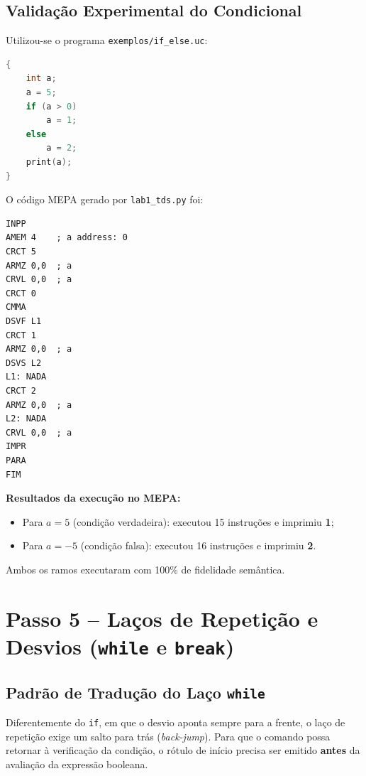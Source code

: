 \documentclass[12pt,a4paper]{article}
\begin{document}
\subsection{Validação Experimental do Condicional}

Utilizou-se o programa \texttt{exemplos/if\_else.uc}:
\begin{lstlisting}[language=C]
{
    int a;
    a = 5;
    if (a > 0)
        a = 1;
    else
        a = 2;
    print(a);
}
\end{lstlisting}

O código MEPA gerado por \texttt{lab1\_tds.py} foi:
\begin{lstlisting}
INPP
AMEM 4    ; a address: 0
CRCT 5
ARMZ 0,0  ; a
CRVL 0,0  ; a
CRCT 0
CMMA
DSVF L1
CRCT 1
ARMZ 0,0  ; a
DSVS L2
L1: NADA
CRCT 2
ARMZ 0,0  ; a
L2: NADA
CRVL 0,0  ; a
IMPR
PARA
FIM
\end{lstlisting}

\noindent\textbf{Resultados da execução no MEPA:}
\begin{itemize}
    \item Para $a = 5$ (condição verdadeira): executou 15 instruções e imprimiu \textbf{1};
    \item Para $a = -5$ (condição falsa): executou 16 instruções e imprimiu \textbf{2}.
\end{itemize}
Ambos os ramos executaram com 100\% de fidelidade semântica.

\section{Passo 5 -- Laços de Repetição e Desvios (\texttt{while} e \texttt{break})}

\subsection{Padrão de Tradução do Laço \texttt{while}}

Diferentemente do \texttt{if}, em que o desvio aponta sempre para a frente, o laço
de repetição exige um salto para trás (\textit{back-jump}). Para que o comando possa
retornar à verificação da condição, o rótulo de início precisa ser emitido
\textbf{antes} da avaliação da expressão booleana.
\end{document}
